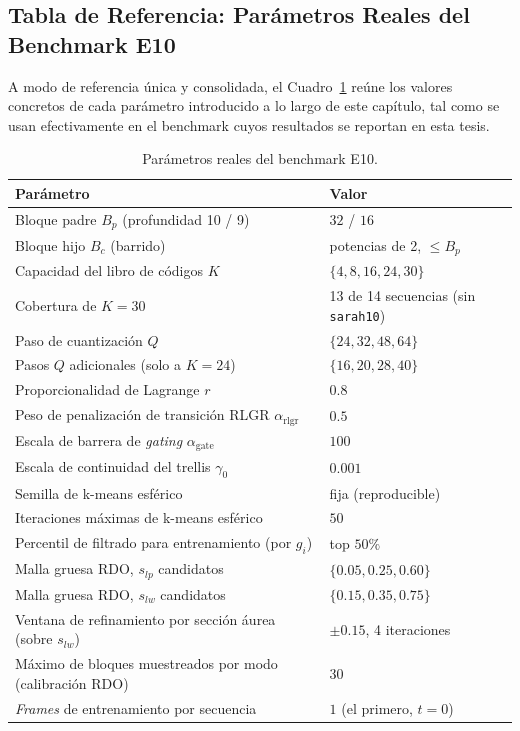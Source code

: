     \subsection{Tabla de Referencia: Parámetros Reales del Benchmark E10}
        A modo de referencia única y consolidada, el Cuadro~\ref{tab:e10_params} reúne los
        valores concretos de cada parámetro introducido a lo largo de este capítulo, tal como
        se usan efectivamente en el benchmark cuyos resultados se reportan en esta tesis.

        \begin{table}[H]
            \centering
            \caption{Parámetros reales del benchmark E10.}
            \label{tab:e10_params}
            \small
            \begin{tabular}{>{\raggedright\arraybackslash}p{7.4cm}l}
                \toprule
                Parámetro & Valor \\
                \midrule
                Bloque padre $B_p$ (profundidad 10 / 9) & $32$ / $16$ \\
                Bloque hijo $B_c$ (barrido) & potencias de 2, $\leq B_p$ \\
                Capacidad del libro de códigos $K$ & $\{4, 8, 16, 24, 30\}$ \\
                Cobertura de $K=30$ & 13 de 14 secuencias (sin \texttt{sarah10}) \\
                Paso de cuantización $Q$ & $\{24, 32, 48, 64\}$ \\
                Pasos $Q$ adicionales (solo a $K=24$) & $\{16, 20, 28, 40\}$ \\
                Proporcionalidad de Lagrange $r$ & $0.8$ \\
                Peso de penalización de transición RLGR $\alpha_{\text{rlgr}}$ & $0.5$ \\
                Escala de barrera de \textit{gating} $\alpha_{\text{gate}}$ & $100$ \\
                Escala de continuidad del trellis $\gamma_0$ & $0.001$ \\
                Semilla de k-means esférico & fija (reproducible) \\
                Iteraciones máximas de k-means esférico & $50$ \\
                Percentil de filtrado para entrenamiento (por $g_i$) & top $50\%$ \\
                Malla gruesa RDO, $s_{lp}$ candidatos & $\{0.05, 0.25, 0.60\}$ \\
                Malla gruesa RDO, $s_{lw}$ candidatos & $\{0.15, 0.35, 0.75\}$ \\
                Ventana de refinamiento por sección áurea (sobre $s_{lw}$) & $\pm 0.15$, 4 iteraciones \\
                Máximo de bloques muestreados por modo (calibración RDO) & $30$ \\
                \textit{Frames} de entrenamiento por secuencia & $1$ (el primero, $t=0$) \\
                \bottomrule
            \end{tabular}
        \end{table}


